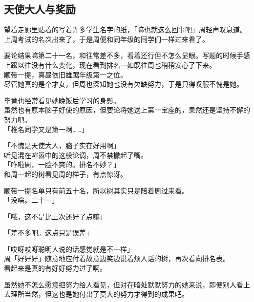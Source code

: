 \subsection{天使大人与奖励}

望着走廊里贴着的写着许多学生名字的纸，「嘛也就这么回事吧」周轻声叹息道。\\

上周考试的名次出来了，于是周便和同年级的同学们一样过来看了。

要论结果嘛第二十一名，和往常差不多，看着还行但不怎么显眼。写题的时候手感上跟以往没有什么变化，现在看到排名一如既往周也稍稍安心了下来。\\

顺带一提，真昼依旧雄踞年级第一之位。\\

尽管她真的是个才女，但周也深知她也没有欠缺努力，于是只得叹服不愧是她。

毕竟也经常看见她晚饭后学习的身影。\\

虽然也有原本脑子好使的原因，但要论将她送上第一宝座的，果然还是坚持不懈的努力吧。\\

「椎名同学又是第一啊……」

「不愧是天使大人，脑子实在好用啊」\\

听见混在喧嚣中的这般论调，周不禁撇起了嘴。\\

「咋啦周，一脸不爽的。排名不妙？」\\

和周一起的树看见周的样子，有点惊讶。

顺带一提名单只有前五十名，所以树其实只是陪着周过来看。\\

「没啥。二十一」

「哦，这不是比上次还好了点嘛」

「差不多吧。这点只是误差」

「哎呀哎呀聪明人说的话感觉就是不一样」\\

周「好好好」随意地应付着故意边笑边说着烦人话的树，再次看向排名表。\\

看起来是真的有好好努力过了啊。

虽然她不怎么愿意把努力给人看见，但对在暗处默默努力的她来说，即便别人看上去理所当然，但这也是她付出了莫大的努力才得到的成果吧。\\

